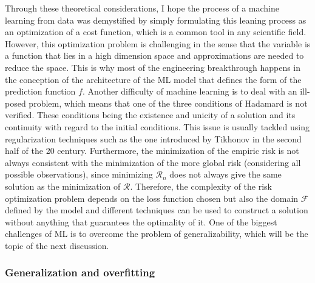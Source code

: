 \documentclass[main]{subfiles}
\begin{document}
Through these theoretical considerations, I hope the process of a machine learning from data was demystified by simply formulating this leaning process as an optimization of a cost function, which is a common tool in any scientific field. However, this optimization problem is challenging in the sense that the variable is a function that lies in a high dimension space and approximations are needed to reduce the space. This is why most of the engineering breakthrough happens in the conception of the architecture of the ML model that defines the form of the prediction function $f$. Another difficulty of machine learning is to deal with an ill-posed problem, which means that one of the three conditions of Hadamard is not verified. These conditions being the existence and unicity of a solution and its continuity  with regard to the initial conditions. This issue is usually tackled using regularization techniques such as the one introduced by Tikhonov in the second half of the 20 century. Furthermore, the minimization of the empiric risk is not always consistent with the minimization of the more global risk (considering all possible observations), since minimizing $\mathcal{R}_n$ does not always give the same solution as the minimization of $\mathcal{R}$. Therefore, the complexity of the risk optimization problem depends on the loss function chosen but also the domain $\mathcal{F}$ defined by the model and different techniques can be used to construct a solution without anything that guarantees the optimality of it. One of the biggest challenges of ML is to overcome the problem of generalizability, which will be the topic of the next discussion.


\subsubsection{Generalization and overfitting}
\end{document}
